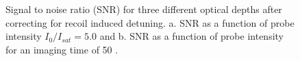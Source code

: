 \documentclass[12pt]{iopart}
\begin{document}
\begin{figure}
\caption{Signal to noise ratio (SNR) for three different optical depths after correcting for recoil induced detuning. a. SNR as a function of probe intensity $I_0/I_{sat}=5.0$ and b. SNR as a function of probe intensity for an imaging time of 50 \us{}.}  
\label{fig:SNR}
\end{figure}
\end{document}
